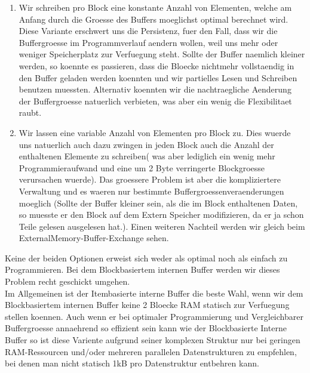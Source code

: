 \documentclass[10pt,a4paper]{article}
\begin{document}
\begin{enumerate}
\item Wir schreiben pro Block eine konstante Anzahl von Elementen, welche am Anfang durch die Groesse des Buffers moeglichst optimal berechnet wird. Diese Variante erschwert uns die Persistenz, fuer den Fall, dass wir die Buffergroesse im Programmverlauf aendern wollen, weil uns mehr oder weniger Speicherplatz zur Verfuegung steht. Sollte der Buffer naemlich kleiner  werden, so koennte es passieren, dass die Bloecke nichtmehr vollstaendig in den Buffer geladen werden koennten und wir partielles Lesen und Schreiben benutzen muessten. Alternativ koennten wir die nachtraegliche Aenderung der Buffergroesse natuerlich verbieten, was aber ein wenig die Flexibilitaet raubt.
\item Wir lassen eine variable Anzahl von Elementen pro Block zu. Dies wuerde uns natuerlich auch dazu zwingen in jeden Block auch die Anzahl der enthaltenen Elemente zu schreiben( was aber lediglich ein wenig mehr Programmieraufwand und eine um 2 Byte verringerte Blockgroesse verursachen wuerde). Das groessere Problem ist aber die kompliziertere Verwaltung und es waeren nur bestimmte Buffergroessenveraenderungen moeglich (Sollte der Buffer kleiner sein, als die im Block enthaltenen Daten, so muesste er den Block auf dem Extern Speicher modifizieren, da er ja schon Teile gelesen ausgelesen hat.). Einen weiteren Nachteil werden wir gleich beim ExternalMemory-Buffer-Exchange sehen.
\end{enumerate} 
Keine der beiden Optionen erweist sich weder als optimal noch als einfach zu Programmieren. Bei dem Blockbasiertem internen Buffer werden wir dieses Problem recht geschickt umgehen.\\
Im Allgemeinen ist der Itembasierte interne Buffer die beste Wahl, wenn wir dem Blockbasiertem internen Buffer keine 2 Bloecke RAM statisch zur Verfuegung stellen koennen. Auch wenn er bei optimaler Programmierung und Vergleichbarer Buffergroesse annaehrend so effizient sein kann wie der Blockbasierte Interne Buffer so ist diese Variente aufgrund seiner komplexen Struktur nur bei geringen RAM-Ressourcen und/oder mehreren parallelen Datenstrukturen zu empfehlen, bei denen man nicht statisch 1kB pro Datenstruktur entbehren kann. 
\end{document}
